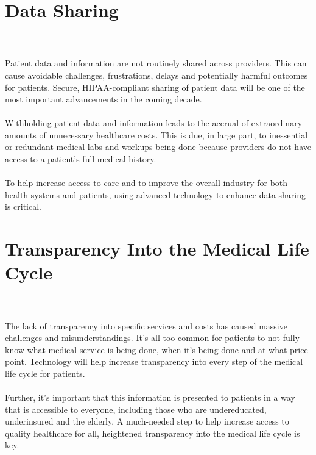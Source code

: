 \documentclass[12pt]{article}
\begin{document}
\section{Data Sharing}
\\
\\
Patient data and information are not routinely shared across providers. This can cause avoidable challenges, frustrations, delays and potentially harmful outcomes for patients. Secure, HIPAA-compliant sharing of patient data will be one of the most important advancements in the coming decade.
\\
\\
Withholding patient data and information leads to the accrual of extraordinary amounts of unnecessary healthcare costs. This is due, in large part, to inessential or redundant medical labs and workups being done because providers do not have access to a patient's full medical history.
\\
\\
To help increase access to care and to improve the overall industry for both health systems and patients, using advanced technology to enhance data sharing is critical.
\section{Transparency Into the Medical Life Cycle}
\\
\\
The lack of transparency into specific services and costs has caused massive challenges and misunderstandings. It's all too common for patients to not fully know what medical service is being done, when it's being done and at what price point. Technology will help increase transparency into every step of the medical life cycle for patients.
\\
\\
Further, it’s important that this information is presented to patients in a way that is accessible to everyone, including those who are undereducated, underinsured and the elderly. A much-needed step to help increase access to quality healthcare for all, heightened transparency into the medical life cycle is key.
\end{document}
